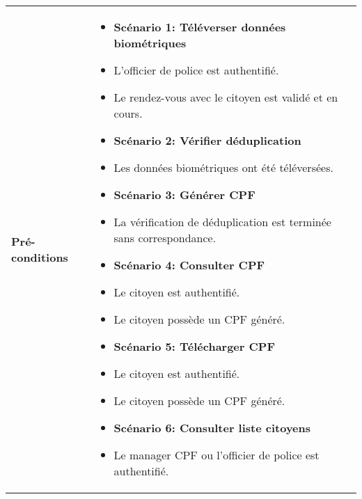 \begin{longtable}{|>{\arraybackslash}p{4.2cm}|>{\arraybackslash}p{12.5cm}|}
\hline
\textbf{Pré-conditions} &
\begin{itemize}[label=]
  \item\textbf{Scénario 1: Téléverser données biométriques}
 \item L'officier de police est authentifié.
 \item Le rendez-vous avec le citoyen est validé et en cours.
 \item\textbf{Scénario 2: Vérifier déduplication}
 \item Les données biométriques ont été téléversées.
 \item\textbf{Scénario 3: Générer CPF}
 \item La vérification de déduplication est terminée sans correspondance.
 \item\textbf{Scénario 4: Consulter CPF}
 \item Le citoyen est authentifié.
 \item Le citoyen possède un CPF généré.
 \item\textbf{Scénario 5: Télécharger CPF}
 \item Le citoyen est authentifié.
 \item Le citoyen possède un CPF généré.
 \item\textbf{Scénario 6: Consulter liste citoyens}
 \item Le manager CPF ou l'officier de police est authentifié.
\end{itemize} \\


\end{longtable}
